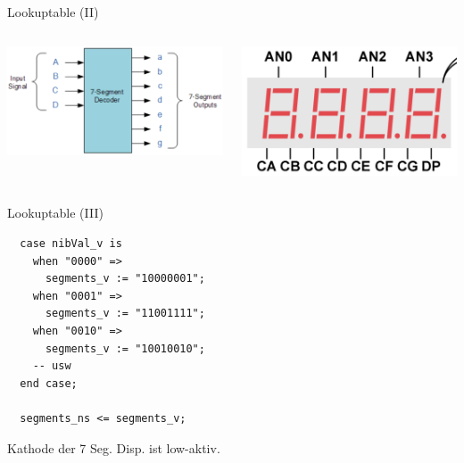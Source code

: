   \begin{frame} {Lookuptable (II)}
    \begin{columns}
        \begin{center}
          \includegraphics[width=\textwidth]{figs/bcd_7seg.png}
        \end{center}
      \begin{center}
        \includegraphics[width=\textwidth]{figs/7seg_package.png}
      \end{center}
    \end{columns}
  \end{frame}

  \begin{frame} [fragile] {Lookuptable (III)}
    \begin{lstlisting}
  case nibVal_v is
    when "0000" => 
      segments_v := "10000001";
    when "0001" => 
      segments_v := "11001111";
    when "0010" => 
      segments_v := "10010010";    
    -- usw
  end case;

  segments_ns <= segments_v;
    \end{lstlisting}
    \begin{alertblock} {}
      Kathode der 7 Seg. Disp. ist low-aktiv.
    \end{alertblock}
  \end{frame}

